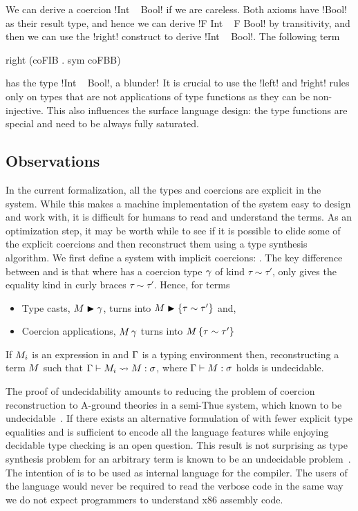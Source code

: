 \documentclass[screen,nonacm,manuscript,review]{acmart} %
\begin{document}
We can derive a coercion !Int ~ Bool! if we are careless.
Both axioms have !Bool! as their result type, and hence
we can derive !F Int ~ F Bool! by transitivity, and then
we can use the !right! construct to derive !Int ~ Bool!.
The following term

\begin{CenteredBox}
\begin{code}
 right (coFIB  . sym coFBB)
\end{code}
\end{CenteredBox}

has the type !Int ~ Bool!, a blunder$!$ It is crucial to use the !left! and !right!
rules only on types that are not applications of type functions as
they can be non-injective. This also influences the surface language
design: the type functions are special and need to be always fully saturated.

\subsection{Observations}
In the current formalization, all the types and coercions are explicit
in the system. While this makes a machine implementation of the system easy
to design and work with, it is difficult for humans to read
and understand the \SFC terms. As an optimization step,
it may be worth while to see if it is possible to elide some of the
explicit coercions and then reconstruct them using a type synthesis
algorithm. We first define a system with implicit coercions: \SFCi.
The key difference between \SFC and \SFCi is that where \SFC has a
coercion type $\gamma$ of kind $\tau\sim\tau'$, \SFCi only gives the
equality kind in curly braces $\tau\sim\tau'$.
Hence, for terms
\begin{itemize}
\item Type casts, $M\mathrel{\blacktriangleright}\gamma$, turns into $M\mathrel{\blacktriangleright}\{\tau \sim \tau'\}$ and,
\item Coercion applications, $M\,\gamma$ turns into $M\,\{\tau \sim \tau'\}$
\end{itemize}
\begin{theorem}
 If $M_i$ is an expression in \SFCi and $\Gamma$ is a typing
 environment then, reconstructing a \SFC term $M$
 such that $\Gamma \vdash M_i \rightsquigarrow M : \sigma$, where
 $\Gamma \vdash M : \sigma$ holds is undecidable.
\end{theorem}
The proof of undecidability amounts to reducing the problem of
coercion reconstruction to A-ground theories in a
semi-Thue system, which known to be
undecidable~\cite{post_recursive_1947}.
If there exists an alternative formulation of \SFCi with fewer
explicit type equalities and is sufficient to encode all the language
features while enjoying decidable type checking is an open question.
This result is not surprising as type synthesis problem for an
arbitrary \SF term is known to be an undecidable
problem~\cite{wells_typability_1999}. The intention of \SFC
is to be used as internal language for the
compiler. The users of the language would never be required to read
the verbose code in the same way we do not expect programmers to
understand x86 assembly code.
\end{document}
